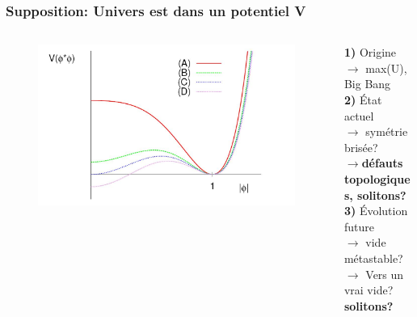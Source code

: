 \documentclass[handout]{beamer}
\begin{document}
  \begin{frame}\frametitle{Supposition: Univers est dans un potentiel V}
  
  
  
\begin{columns}[T]
    \begin{column}[T]{.6\linewidth}
        \begin{figure}[0.4\textwidth]
    \includegraphics[scale=0.27]{evo_pot.jpg}
    \end{figure}
   
	
    \end{column}
    \begin{column}[T]{.5\linewidth}
 \textbf{1)} Origine $\rightarrow$ max(U), Big Bang\\[0.5 cm]
    \textbf{2)} État actuel 
    \\ $\rightarrow$ symétrie brisée? \\$\rightarrow$\textbf{défauts topologiques, solitons?}\\[0.5 cm]

 	\textbf{3)} Évolution future
 	       \\ $\rightarrow$ vide métastable?
	\\ $\rightarrow$ Vers un vrai vide? \textbf{solitons?}
    
    \end{column}
  \end{columns} 
    \end{frame} 

%    
\end{document}

